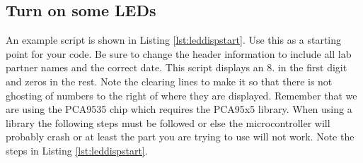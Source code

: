 
\subsection{Turn on some LEDs}
An example script is shown in Listing \ref{lst:leddispstart}. Use this as a starting point for your
code. Be sure to change the header information to include all lab partner names and the correct 
date. This script displays an 8. in the first digit and zeros in the rest. Note the clearing
lines to make it so that there is not ghosting of numbers to the right of where they are displayed. 
Remember that we are using the PCA9535 chip which requires the PCA95x5 library. When using a library 
the following steps must be followed or else the microcontroller will probably crash or at least 
the part you are trying to use will not work. Note the steps in Listing \ref{lst:leddispstart}.

